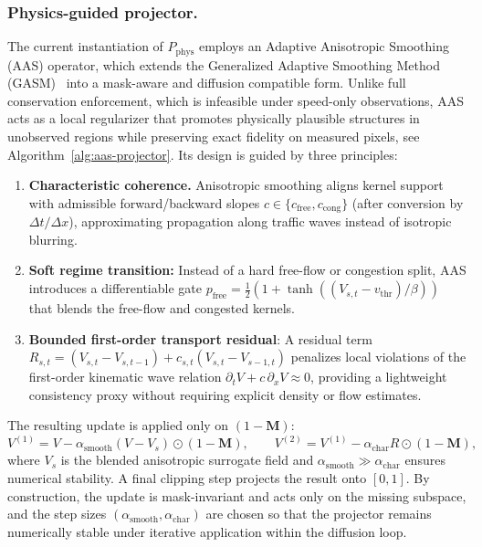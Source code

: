 \documentclass[a4paper,fleqn]{cas-sc}
\numberwithin{equation}{section}
\begin{document}
\subsubsection{Physics-guided projector.}
The current instantiation of $P_{\text{phys}}$ employs an Adaptive Anisotropic Smoothing (AAS) operator, which extends the Generalized Adaptive Smoothing Method (GASM)~\citep{treiber2011reconstructing} into a mask-aware and diffusion compatible form. 
Unlike full conservation enforcement, which is infeasible under speed-only observations, AAS acts as a local regularizer that promotes physically plausible structures in unobserved regions while preserving exact fidelity on measured pixels, see Algorithm~\ref{alg:aas-projector}.
Its design is guided by three principles:
\begin{enumerate}
    \item \textbf{Characteristic coherence.} Anisotropic smoothing aligns kernel support with admissible forward/backward slopes $c\in\{c_{\text{free}},c_{\text{cong}}\}$ (after conversion by $\Delta t/\Delta x$), approximating propagation along traffic waves instead of isotropic blurring.
    \item \textbf{Soft regime transition:} Instead of a hard free-flow or congestion split, AAS introduces a differentiable gate $p_{\text{free}}=\frac12(1+\tanh((V_{s,t}-v_{\text{thr}})/\beta))$ that blends the free-flow and congested kernels.
    \item \textbf{Bounded first-order transport residual}: A residual term 
    $R_{s,t} = (V_{s,t}-V_{s,t-1}) + c_{s,t}(V_{s,t}-V_{s-1,t})$
    penalizes local violations of the first-order kinematic wave relation 
    $\partial_t V + c\,\partial_x V \approx 0$, providing a lightweight consistency proxy without requiring explicit density or flow estimates.
\end{enumerate}
The resulting update is applied only on $(1-\mathbf M)$:
\begin{equation}
    V^{(1)}=V-\alpha_{\text{smooth}}(V-V_s)\odot(1-\mathbf M),\qquad
    V^{(2)}=V^{(1)}-\alpha_{\text{char}}R\odot(1-\mathbf M),
    \label{eq:relax}
\end{equation}
where $V_s$ is the blended anisotropic surrogate field and $\alpha_{\text{smooth}}\gg\alpha_{\text{char}}$ ensures numerical stability. 
A final clipping step projects the result onto $[0,1]$. 
By construction, the update is mask-invariant and acts only on the missing subspace, and the step sizes $(\alpha_{\text{smooth}},\alpha_{\text{char}})$ are chosen so that the projector remains numerically stable under iterative application within the diffusion loop.
\end{document}
